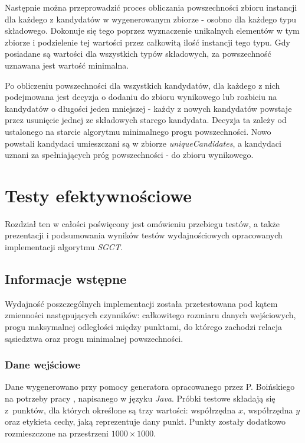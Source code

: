 \documentclass[12pt]{article}
\begin{document}
Następnie można przeprowadzić proces obliczania powszechności zbioru instancji dla każdego z kandydatów w wygenerowanym zbiorze - osobno dla każdego typu składowego. Dokonuje się tego poprzez wyznaczenie unikalnych elementów w tym zbiorze i podzielenie tej wartości przez całkowitą ilość instancji tego typu. Gdy posiadane są wartości dla wszystkich typów składowych, za powszechność uznawana jest wartość minimalna.

Po obliczeniu powszechności dla wszystkich kandydatów, dla każdego z nich podejmowana jest decyzja o dodaniu do zbioru wynikowego lub rozbiciu na kandydatów o długości jeden mniejszej - każdy z nowych kandydatów powstaje przez usunięcie jednej ze składowych starego kandydata. Decyzja ta zależy od ustalonego na starcie algorytmu minimalnego progu powszechności. Nowo powstali kandydaci umieszczani są w zbiorze \textit{uniqueCandidates}, a kandydaci uznani za spełniających próg powszechności - do zbioru wynikowego.

\newpage

\section{Testy efektywnościowe}
\label{sec:tests}

Rozdział ten w całości poświęcony jest omówieniu przebiegu testów, a także prezentacji i podsumowania wyników testów wydajnościowych opracowanych implementacji algorytmu \textit{SGCT}. 

\subsection{Informacje wstępne}

Wydajność poszczególnych implementacji została przetestowana pod kątem zmienności następujących czynników: całkowitego rozmiaru danych wejściowych, progu maksymalnej odległości między punktami, do którego zachodzi relacja sąsiedztwa oraz progu minimalnej powszechności.

\subsubsection{Dane wejściowe}

Dane wygenerowano przy pomocy generatora opracowanego przez P. Boińskiego na potrzeby pracy \cite{boinski}, napisanego w języku \textit{Java}. Próbki testowe składają się z~punktów, dla których określone są trzy wartości: współrzędna $ x $, współrzędna $ y $ oraz etykieta cechy, jaką reprezentuje dany punkt. Punkty zostały dodatkowo rozmieszczone na przestrzeni $ 1000 \times 1000$. 
\end{document}
